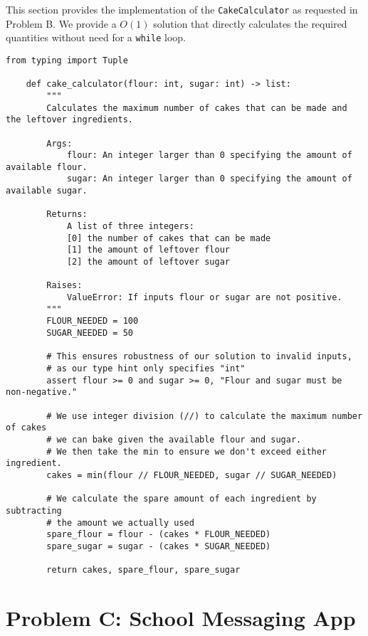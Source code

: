 \documentclass{solutionclass} %
\begin{document}
    \begin{solution}
    This section provides the implementation of the \texttt{CakeCalculator} as requested in Problem B. We provide a $O(1)$ solution that directly calculates the required quantities without need for a \texttt{while} loop.

    \begin{lstlisting}[style=pythonstyle]
    from typing import Tuple

    def cake_calculator(flour: int, sugar: int) -> list:
        """
        Calculates the maximum number of cakes that can be made and the leftover ingredients.
        
        Args:
            flour: An integer larger than 0 specifying the amount of available flour.
            sugar: An integer larger than 0 specifying the amount of available sugar.
            
        Returns:
            A list of three integers: 
            [0] the number of cakes that can be made
            [1] the amount of leftover flour
            [2] the amount of leftover sugar
            
        Raises:
            ValueError: If inputs flour or sugar are not positive.
        """
        FLOUR_NEEDED = 100
        SUGAR_NEEDED = 50

        # This ensures robustness of our solution to invalid inputs, 
        # as our type hint only specifies "int"
        assert flour >= 0 and sugar >= 0, "Flour and sugar must be non-negative."

        # We use integer division (//) to calculate the maximum number of cakes
        # we can bake given the available flour and sugar.
        # We then take the min to ensure we don't exceed either ingredient.
        cakes = min(flour // FLOUR_NEEDED, sugar // SUGAR_NEEDED)

        # We calculate the spare amount of each ingredient by subtracting
        # the amount we actually used
        spare_flour = flour - (cakes * FLOUR_NEEDED)
        spare_sugar = sugar - (cakes * SUGAR_NEEDED)

        return cakes, spare_flour, spare_sugar
    \end{lstlisting}
    \end{solution}

    \divider

    \section{Problem C: School Messaging App}
\end{document}
